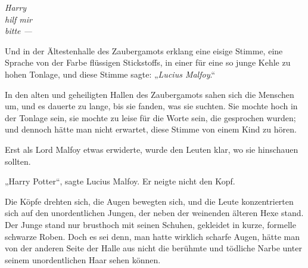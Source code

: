 

\emph{Harry\\
hilf mir\\
bitte —}

Und in der Ältestenhalle des Zaubergamots erklang eine eisige Stimme, eine Sprache von der Farbe flüssigen Stickstoffs, in einer für eine so junge Kehle zu hohen Tonlage, und diese Stimme sagte:
„\emph{Lucius Malfoy}.“

\later

In den alten und geheiligten Hallen des Zaubergamots sahen sich die Menschen um, und es dauerte zu lange, bis sie fanden, was sie suchten. Sie mochte hoch in der Tonlage sein, sie mochte zu leise für die Worte sein, die gesprochen wurden; und dennoch hätte man nicht erwartet, diese Stimme von einem Kind zu hören.

Erst als Lord Malfoy etwas erwiderte, wurde den Leuten klar, wo sie hinschauen sollten.

„Harry Potter“, sagte Lucius Malfoy. Er neigte nicht den Kopf.

Die Köpfe drehten sich, die Augen bewegten sich, und die Leute konzentrierten sich auf den unordentlichen Jungen, der neben der weinenden älteren Hexe stand. Der Junge stand nur brusthoch mit seinen Schuhen, gekleidet in kurze, formelle schwarze Roben. Doch es sei denn, man hatte wirklich scharfe Augen, hätte man von der anderen Seite der Halle aus nicht die berühmte und tödliche Narbe unter seinem unordentlichen Haar sehen können.

